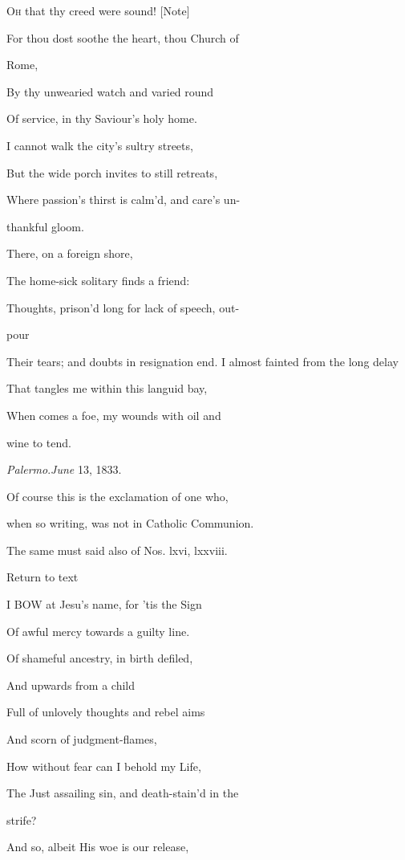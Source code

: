 O\textsc{h} that
thy creed were sound! [Note]

For thou dost soothe the heart, thou Church of

Rome,

By thy unwearied watch and varied round

Of service, in thy Saviour's holy home.

I cannot walk the city's sultry streets,

But the wide porch invites to still retreats,

Where passion's thirst is calm'd, and care's un-

thankful gloom.

There, on
a foreign shore,

The home-sick solitary finds a friend:

Thoughts, prison'd long for lack of speech, out-

pour

Their tears; and doubts in resignation end. I almost fainted from the long delay

That tangles me within this languid bay,

When comes a foe, my wounds with oil and

wine to tend.

\emph{Palermo}.\emph{June} 13, 1833.


Of course this is the exclamation of one who,

when so writing, was not in Catholic Communion.

The same must said also of Nos. lxvi, lxxviii.

Return to text


I BOW at Jesu's name, for 'tis the Sign

Of awful mercy towards a guilty line.

Of shameful ancestry, in birth defiled,

And upwards from a child

Full of unlovely thoughts and rebel aims

And scorn of judgment-flames,

How without fear can I behold my Life,

The Just assailing sin, and death-stain'd in the

strife?

And so, albeit His woe is our release,

